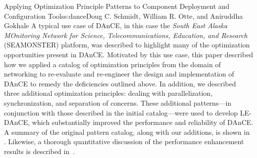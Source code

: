 \begin{aosachapter}{Applying Optimization Principle Patterns to Component Deployment and
                    Configuration Tools}{s:dance}{Doug C. Schmidt, William R. Otte, and Aniruddha Gokhale}
A typical use case of DAnCE, in this case the \emph{South East Alaska
MOnitoring Network for Science, Telecommunications, Education, and
Research} (SEAMONSTER) platform, was described to highlight many of the
optimization opportunities present in DAnCE. Motivated by this use case,
this paper described how we applied a catalog of optimization principles
from the domain of networking to re-evaluate and re-engineer the design
and implementation of DAnCE to remedy the deficiencies outlined above.
In addition, we described three additional optimization principles:
dealing with parallelization, synchronization, and separation of
concerns. These additional patterns---in conjunction with those
described in the initial catalog---were used to develop LE-DAnCE, which
substantially improved the performance and reliability of DAnCE. A
summary of the original pattern catalog, along with our additions, is
shown in . Likewise, a thorough
quantitative discussion of the performance enhancement results is
described in~\cite{SchmidtDnCIST:13}.


\end{aosachapter}
